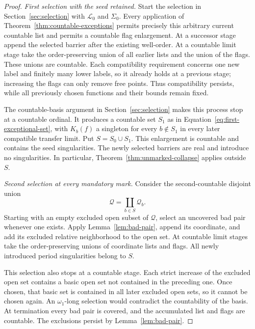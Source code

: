 \begin{proof}
\emph{First selection with the seed retained.}
Start the selection in Section~\ref{sec:selection} with
$\mathscr L_0$ and $\Sigma_0$.  Every application of
Theorem~\ref{thm:countable-exceptions} permits precisely this arbitrary
current countable list and permits a countable flag enlargement.
At a successor stage append the selected barrier after the existing
well-order.  At a countable limit stage take the order-preserving
union of all earlier lists and the union of the flags.  These unions
are countable.  Each compatibility requirement concerns one new
label and finitely many lower labels, so it already holds at a
previous stage; increasing the flags can only remove free points.
Thus compatibility persists, while all previously chosen functions
and their bounds remain fixed.

The countable-basis argument in Section~\ref{sec:selection} makes
this process stop at a countable ordinal.  It produces a countable
set $S_1$ as in Equation~\eqref{eq:first-exceptional-set}, with
$K_b(f)$ a singleton for every $b\notin S_1$ in every later
compatible transfer limit.  Put $S=S_0\cup S_1$.  This enlargement
is countable and contains the seed singularities.  The newly selected
barriers are real and introduce no singularities.  In particular,
Theorem~\ref{thm:unmarked-collapse} applies outside $S$.

\emph{Second selection at every mandatory mark.}
Consider the second-countable disjoint union
\[
 \mathcal Q=\coprod_{b\in S}\mathcal Q_b.
\]
Starting with an empty excluded open subset of $\mathcal Q$, select
an uncovered bad pair whenever one exists.  Apply
Lemma~\ref{lem:bad-pair}, append its coordinate, and add its excluded
relative neighborhood to the open set.  At countable limit stages
take the order-preserving unions of coordinate lists and flags.
All newly introduced period singularities belong to $S$.

This selection also stops at a countable stage.  Each strict
increase of the excluded open set contains a basic open set not
contained in the preceding one.  Once chosen, that basic set is
contained in all later excluded open sets, so it cannot be chosen
again.  An $\omega_1$-long selection would contradict the countability
of the basis.  At termination every bad pair is covered, and the
accumulated list and flags are countable.  The exclusions persist by
Lemma~\ref{lem:bad-pair}.


\end{proof}

